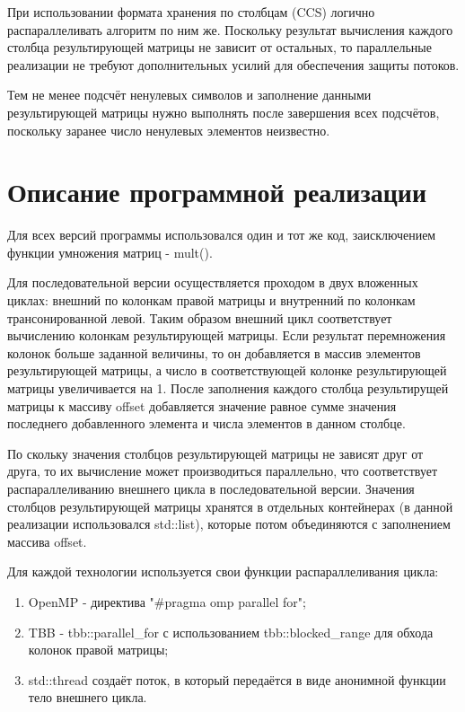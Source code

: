 \documentclass[12pt]{article}
\begin{document}
При использовании формата хранения по столбцам (CCS) логично распараллеливать алгоритм по ним же. Поскольку результат вычисления каждого столбца результирующей матрицы не зависит от остальных, то параллельные реализации не требуют дополнительных усилий для обеспечения защиты потоков.

Тем не менее подсчёт ненулевых символов и заполнение данными результирующей матрицы нужно выполнять после завершения всех подсчётов, поскольку заранее число ненулевых элементов неизвестно.

\section*{Описание программной реализации}

Для всех версий программы использовался один и тот же код, заисключением функции умножения матриц - mult().

Для последовательной версии осуществляется проходом в двух вложенных циклах: внешний по колонкам правой матрицы и внутренний по колонкам трансонированной левой. Таким образом внешний цикл соответствует вычислению колонкам результирующей матрицы. Если результат перемножения колонок больше заданной величины, то он добавляется в массив элементов результирующей матрицы, а число в соответствующей колонке результирующей матрицы увеличивается на 1. После заполнения каждого столбца результирущей матрицы к массиву offset добавляется значение равное сумме значения последнего добавленного элемента и числа элементов в данном столбце.

По скольку значения столбцов результирующей матрицы не зависят друг от друга, то их вычисление может производиться параллельно, что соответствует распараллеливанию внешнего цикла в последовательной версии. Значения столбцов результирующей матрицы хранятся в отдельных контейнерах (в данной реализации использовался std::list), которые потом объединяются с заполнением массива offset.

Для каждой технологии используется свои функции распараллеливания цикла: 

\begin{enumerate}
    \item OpenMP - директива "\#pragma omp parallel for";
    \item TBB - tbb::parallel\_for с использованием tbb::blocked\_range для обхода колонок правой матрицы;
    \item std::thread создаёт поток, в который передаётся в виде анонимной функции тело внешнего цикла. 
\end{enumerate}
\end{document}

